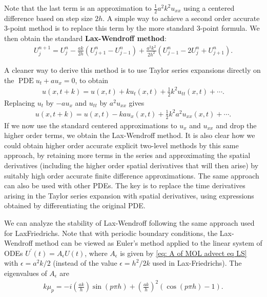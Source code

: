 Note that the last term is an approximation to $\frac{1}{2} a^2 k^2 u_{x x}$ using a centered difference based on step size $2 h$. A simple way to achieve a second order accurate 3-point method is to replace this term by the more standard 3-point formula. We then obtain the standard \textbf{Lax-Wendroff method}:
\begin{align}
    \label{eq: Lax-Wendroff method}
U_j^{n+1}=U_j^n-\frac{a k}{2 h}\left(U_{j+1}^n-U_{j-1}^n\right)+\frac{a^2 k^2}{2 h^2}\left(U_{j-1}^n-2 U_j^n+U_{j+1}^n\right) .
\end{align}

A cleaner way to derive this method is to use Taylor series expansions directly on the $\operatorname{PDE} u_t+a u_x=0$, to obtain
\begin{align*}
u(x, t+k)=u(x, t)+k u_t(x, t)+\frac{1}{2} k^2 u_{t t}(x, t)+\cdots .
\end{align*}
Replacing $u_t$ by $-a u_x$ and $u_{t t}$ by $a^2 u_{x x}$ gives
\begin{align*}
u(x, t+k)=u(x, t)-k a u_x(x, t)+\frac{1}{2} k^2 a^2 u_{x x}(x, t)+\cdots .
\end{align*}
If we now use the standard centered approximations to $u_x$ and $u_{x x}$ and drop the higher order terms, we obtain the Lax-Wendroff method. It is also clear how we could obtain higher order accurate explicit two-level methods by this same approach, by retaining more terms in the series and approximating the spatial derivatives (including the higher order spatial derivatives that will then arise) by suitably high order accurate finite difference approximations. The same approach can also be used with other PDEs. The key is to replace the time derivatives arising in the Taylor series expansion with spatial derivatives, using expressions obtained by differentiating the original PDE.

We can analyze the stability of Lax-Wendroff following the same approach used for LaxFriedrichs. Note that with periodic boundary conditions, the Lax-Wendroff method can be viewed as Euler's method applied to the linear system of ODEs $U^{\prime}(t)=A_\epsilon U(t)$, where $A_\epsilon$ is given by \eqref{eq: A of MOL advect eq LS} with $\epsilon=a^2 k / 2$ (instead of the value $\epsilon=h^2 / 2 k$ used in Lax-Friedrichs). The eigenvalues of $A_\epsilon$ are
\begin{align*}
k \mu_p=-i\left(\frac{a k}{h}\right) \sin (p \pi h)+\left(\frac{a k}{h}\right)^2(\cos (p \pi h)-1) .
\end{align*}


